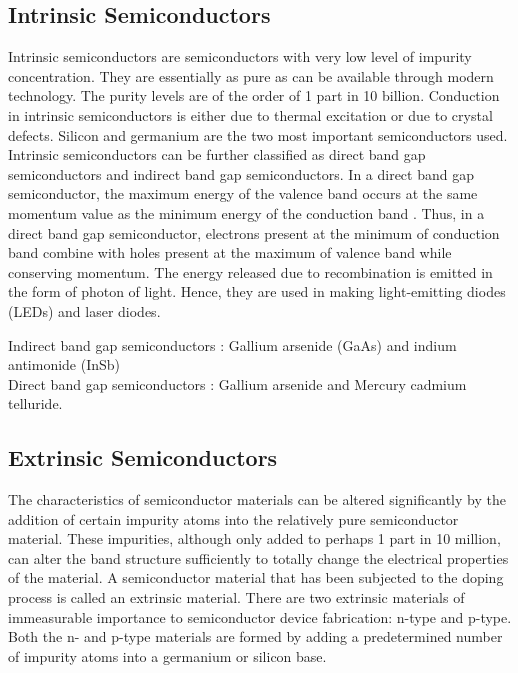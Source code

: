 \subsection{Intrinsic Semiconductors}
Intrinsic semiconductors are semiconductors with very low level of impurity concentration. They are essentially as pure as can be available through modern technology. The purity levels are of the order of 1 part in 10 billion. Conduction in intrinsic semiconductors is either due to thermal excitation or due to crystal defects. Silicon and germanium are the two most important semiconductors used. \\
Intrinsic semiconductors can be further classified as direct band gap semiconductors and indirect band gap semiconductors. In a direct band gap semiconductor, the maximum energy of the valence band occurs at the same momentum value as the minimum energy of the conduction band . Thus, in a direct band gap semiconductor, electrons present at the minimum of conduction band combine with holes present at the maximum of valence band while conserving momentum. The energy released due to recombination is emitted in the form of photon of light. Hence, they are used in making light-emitting diodes (LEDs) and laser diodes. 
\begin{example}$\left. \right. $\\
Indirect band gap semiconductors : Gallium arsenide (GaAs) and indium antimonide (InSb)\\
Direct band gap semiconductors : Gallium arsenide and Mercury cadmium telluride.
\end{example}

\subsection{Extrinsic Semiconductors}
The characteristics of semiconductor materials can be altered significantly by the addition of certain impurity atoms into the relatively pure semiconductor material. These impurities, although only added to perhaps 1 part in 10 million, can alter the band structure sufficiently to totally change the electrical properties of the material. A semiconductor material that has been subjected to the doping process is called an extrinsic material. There are two extrinsic materials of immeasurable importance to semiconductor device fabrication: n-type and p-type. Both the n- and p-type materials are formed by adding a predetermined number of impurity atoms into a germanium or silicon base.
